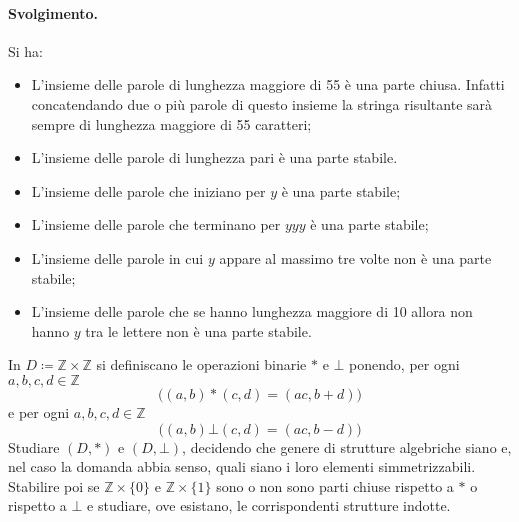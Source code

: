 \paragraph*{Svolgimento.} Si ha:
\begin{itemize}
	\item L'insieme delle parole di lunghezza maggiore di 55 è una parte chiusa. Infatti concatendando due o più parole di questo insieme la stringa risultante sarà sempre di lunghezza maggiore di 55 caratteri;
	\item L'insieme delle parole di lunghezza pari è una parte stabile.
	\item L'insieme delle parole che iniziano per $y$ è una parte stabile;
	\item L'insieme delle parole che terminano per $yyy$ è una parte stabile;
	\item L'insieme delle parole in cui $y$ appare al massimo tre volte non è una parte stabile;
	\item L'insieme delle parole che se hanno lunghezza maggiore di 10 allora non hanno $y$ tra le lettere non è una parte stabile. \hfill \blacksquare
\end{itemize}
\begin{exsbox}
	In $D \coloneqq \mathbb{Z} \times \mathbb{Z}$ si definiscano le operazioni binarie $\ast$ e $\bot$ ponendo, per ogni $a,b,c,d \in \mathbb{Z}$ $$\bigl((a,b) \ast (c,d) = (ac,b+d)\bigr)$$ e per ogni $a,b,c,d \in \mathbb{Z}$ $$\bigl((a,b) \bot (c,d) = (ac,b-d)\bigr)$$ Studiare $(D,\ast)$ e $(D, \bot)$, decidendo che genere di strutture algebriche siano e, nel caso la domanda abbia senso, quali siano i loro elementi simmetrizzabili. Stabilire poi se $\mathbb{Z} \times \{0\}$ e $\mathbb{Z} \times \{1\}$ sono o non sono parti chiuse rispetto a $\ast$ o rispetto a $\bot$ e studiare, ove esistano, le corrispondenti strutture indotte.
\end{exsbox}
